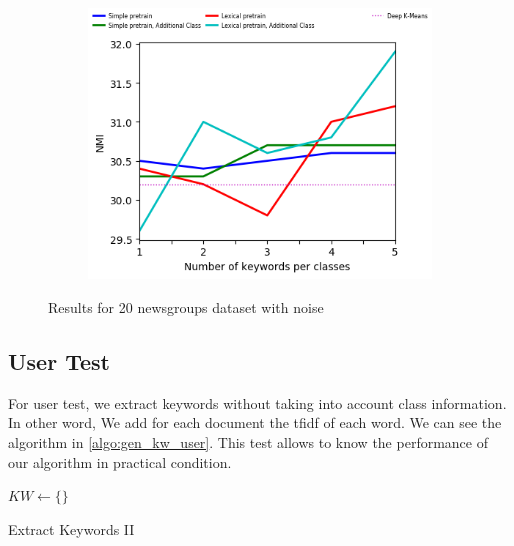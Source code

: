 \begin{figure}[!h]
\begin{subfigure}[b]{\textwidth}
    \includegraphics[scale=0.82]{parts/res/dat_file/nmi/20NEWS_noisy_NMI.png}
  \end{subfigure}\caption{\label{fig:20news_noise}Results for 20 newsgroups dataset with noise}
\end{figure}

\subsection{User Test}
For user test, we extract keywords without taking into account class information. In other 
word, We add for each document the tfidf of each word. We can see the algorithm in 
\ref{algo:gen_kw_user}. This test allows to know the performance of our algorithm
in practical condition.
\begin{algorithm}
  $KW \gets \{\}$\\
  \caption{\label{algo:gen_kw_user}Extract Keywords II}
\end{algorithm}